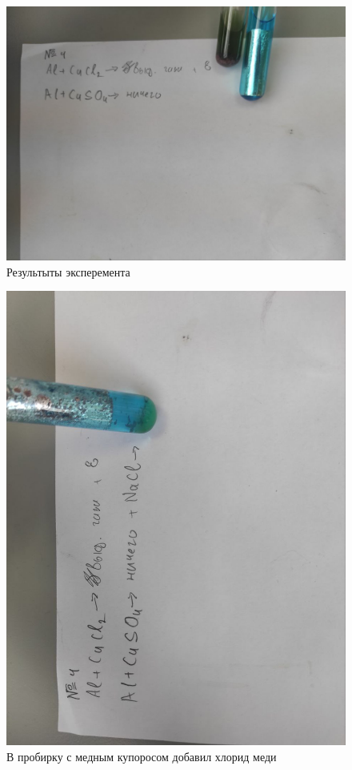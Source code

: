\begin{figure}[h]
    \centering
    \includegraphics[trim={0 15cm 0 0},clip,width=\textwidth]{Ex_4/Ex_4_1.jpg}
     \caption{Результыты эксперемента}
    \label{Ex_4_1}
\end{figure}
\begin{figure}[h]
    \centering
    \includegraphics[trim={0 30cm 0 0},clip,width=\textwidth]{Ex_4/Ex_4_2.jpg}
     \caption{В пробирку с медным купоросом добавил хлорид меди}
    \label{Ex_4_2}
\end{figure}






